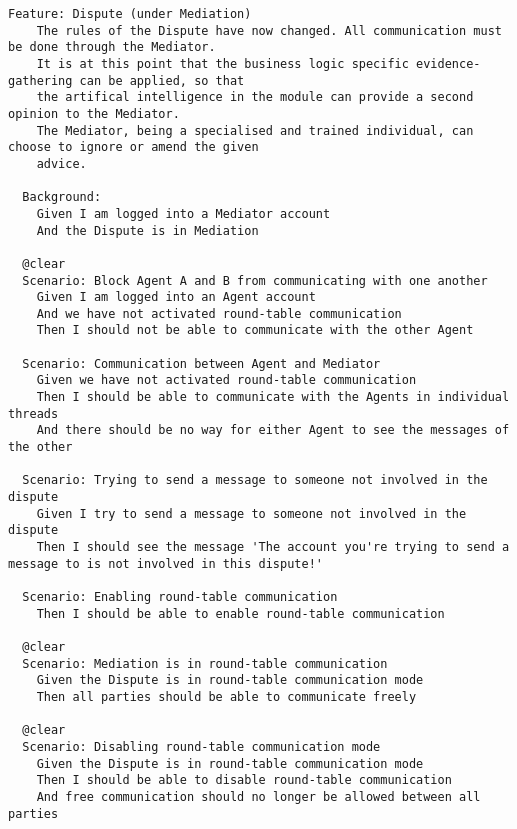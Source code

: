 \begin{lstlisting}
Feature: Dispute (under Mediation)
    The rules of the Dispute have now changed. All communication must be done through the Mediator.
    It is at this point that the business logic specific evidence-gathering can be applied, so that
    the artifical intelligence in the module can provide a second opinion to the Mediator.
    The Mediator, being a specialised and trained individual, can choose to ignore or amend the given
    advice.

  Background:
    Given I am logged into a Mediator account
    And the Dispute is in Mediation

  @clear
  Scenario: Block Agent A and B from communicating with one another
    Given I am logged into an Agent account
    And we have not activated round-table communication
    Then I should not be able to communicate with the other Agent

  Scenario: Communication between Agent and Mediator
    Given we have not activated round-table communication
    Then I should be able to communicate with the Agents in individual threads
    And there should be no way for either Agent to see the messages of the other

  Scenario: Trying to send a message to someone not involved in the dispute
    Given I try to send a message to someone not involved in the dispute
    Then I should see the message 'The account you're trying to send a message to is not involved in this dispute!'

  Scenario: Enabling round-table communication
    Then I should be able to enable round-table communication

  @clear
  Scenario: Mediation is in round-table communication
    Given the Dispute is in round-table communication mode
    Then all parties should be able to communicate freely

  @clear
  Scenario: Disabling round-table communication mode
    Given the Dispute is in round-table communication mode
    Then I should be able to disable round-table communication
    And free communication should no longer be allowed between all parties

\end{lstlisting}